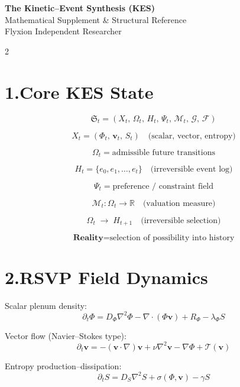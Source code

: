 \documentclass[10pt,a4paper]{article}
\theoremstyle{plain}
\theoremstyle{remark}
\newcommand{\G}{\mathcal{G}}
\newcommand{\M}{\mathcal{M}}
\newcommand{\KES}{\mathfrak{S}}
\begin{document}
\begin{center}
{\LARGE \textbf{The Kinetic--Event Synthesis (KES)}}\\[0.4em]
{\large Mathematical Supplement \& Structural Reference}\\[0.2em]
{\small Flyxion \quad\textbullet\quad Independent Researcher}
\end{center}

\vspace{0.6em}

\begin{multicols}{2}

\section*{1.\enspace Core KES State}

\[
\KES_t =
(X_t,\,\Omega_t,\,H_t,\,\Psi_t,\,\M_t,\,\G,\,\mathcal{F})
\]

\[
X_t = (\Phi_t,\,\mathbf{v}_t,\,S_t)
\quad\text{(scalar, vector, entropy)}
\]

\[
\Omega_t = \text{admissible future transitions}
\]

\[
H_t = \{e_0,e_1,\dots,e_t\}
\quad\text{(irreversible event log)}
\]

\[
\Psi_t = \text{preference / constraint field}
\]

\[
\M_t : \Omega_t \to \mathbb{R}
\quad\text{(valuation measure)}
\]

\[
\boxed{\Omega_t \;\longrightarrow\; H_{t+1}}
\quad\text{(irreversible selection)}
\]

\[
\textbf{Reality}
=
\text{selection of possibility into history}
\]

\section*{2.\enspace RSVP Field Dynamics}

Scalar plenum density:
\[
\partial_t \Phi
=
D_\Phi \nabla^2\Phi
-
\nabla\cdot(\Phi\mathbf{v})
+
R_\Phi
-
\lambda_\Phi S
\]

Vector flow (Navier--Stokes type):
\[
\partial_t \mathbf{v}
=
-(\mathbf{v}\cdot\nabla)\mathbf{v}
+
\nu\nabla^2\mathbf{v}
-
\nabla\Phi
+
\mathcal{T}(\mathbf{v})
\]

Entropy production--dissipation:
\[
\partial_t S
=
D_S\nabla^2S
+
\sigma(\Phi,\mathbf{v})
-
\gamma S
\]


\end{multicols}
\end{document}
